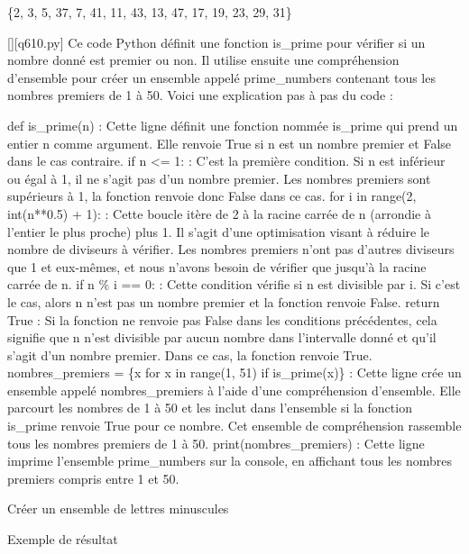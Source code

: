 \{2, 3, 5, 37, 7, 41, 11, 43, 13, 47, 17, 19, 23, 29, 31\}
        \par
        \begin{solution}
            \renewcommand{\nomfichier}{q610.py}
            \pythonfile{\chemincode \nomfichier}[][\nomfichier]
            Ce code Python définit une fonction is\_prime pour vérifier si un nombre donné est premier ou non. Il utilise ensuite une compréhension d'ensemble pour créer un ensemble appelé prime\_numbers contenant tous les nombres premiers de 1 à 50. Voici une explication pas à pas du code :

    def is\_prime(n) : Cette ligne définit une fonction nommée is\_prime qui prend un entier n comme argument. Elle renvoie True si n est un nombre premier et False dans le cas contraire.
    if n <= 1: : C'est la première condition. Si n est inférieur ou égal à 1, il ne s'agit pas d'un nombre premier. Les nombres premiers sont supérieurs à 1, la fonction renvoie donc False dans ce cas.
    for i in range(2, int(n**0.5) + 1): : Cette boucle itère de 2 à la racine carrée de n (arrondie à l'entier le plus proche) plus 1. Il s'agit d'une optimisation visant à réduire le nombre de diviseurs à vérifier. Les nombres premiers n'ont pas d'autres diviseurs que 1 et eux-mêmes, et nous n'avons besoin de vérifier que jusqu'à la racine carrée de n.
    if n \% i == 0: : Cette condition vérifie si n est divisible par i. Si c'est le cas, alors n n'est pas un nombre premier et la fonction renvoie False.
    return True : Si la fonction ne renvoie pas False dans les conditions précédentes, cela signifie que n n'est divisible par aucun nombre dans l'intervalle donné et qu'il s'agit d'un nombre premier. Dans ce cas, la fonction renvoie True.
    nombres\_premiers = \{x for x in range(1, 51) if is\_prime(x)\} : Cette ligne crée un ensemble appelé nombres\_premiers à l'aide d'une compréhension d'ensemble. Elle parcourt les nombres de 1 à 50 et les inclut dans l'ensemble si la fonction is\_prime renvoie True pour ce nombre. Cet ensemble de compréhension rassemble tous les nombres premiers de 1 à 50.
    print(nombres\_premiers) : Cette ligne imprime l'ensemble prime\_numbers sur la console, en affichant tous les nombres premiers compris entre 1 et 50.
        \end{solution}
        

        \question
        Créer un ensemble de lettres minuscules

Exemple de résultat

